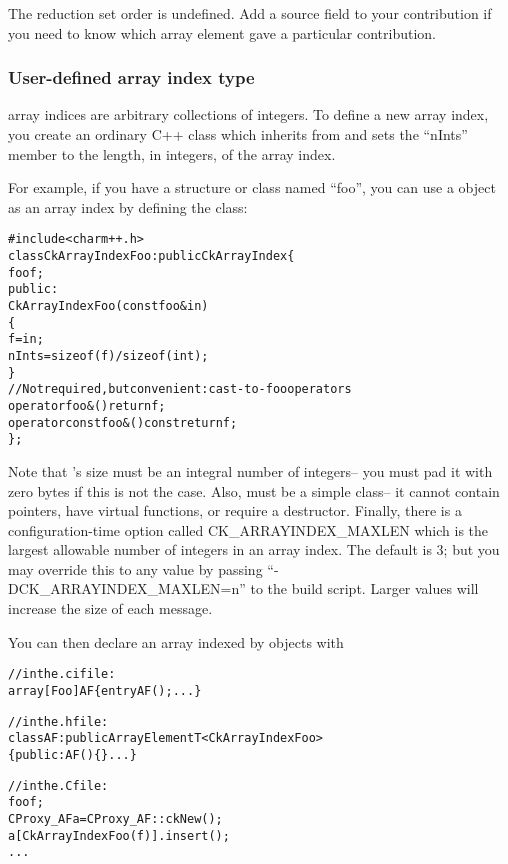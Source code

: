 The reduction set order is undefined.  Add a source field to your contribution
if you need to know which array element gave a particular contribution.



\subsubsection{User-defined array index type}

\charmpp{} array indices are arbitrary collections of integers.
To define a new array index, you create an ordinary C++ class 
which inherits from  and sets the ``nInts'' member
to the length, in integers, of the array index.

For example, if you have a structure or class named ``foo'', you 
can use a  object as an array index by defining the class:

\begin{alltt}
#include <charm++.h>
class CkArrayIndexFoo:public CkArrayIndex \{
    foo f;
public:
    CkArrayIndexFoo(const foo \&in) 
    \{
        f=in;
        nInts=sizeof(f)/sizeof(int);
    \}
    //Not required, but convenient: cast-to-foo operators
    operator foo &() {return f;}
    operator const foo &() const {return f;}
\};
\end{alltt}

Note that 's size must be an integral number of integers--
you must pad it with zero bytes if this is not the case.
Also,  must be a simple class-- it cannot contain 
pointers, have virtual functions, or require a destructor.
Finally, there is a \charmpp configuration-time option called
CK\_ARRAYINDEX\_MAXLEN  
which is the largest allowable number of 
integers in an array index.  The default is 3; but you may 
override this to any value by passing ``-DCK\_ARRAYINDEX\_MAXLEN=n'' 
to the \charmpp build script. Larger values will increase the
size of each message.

You can then declare an array indexed by  objects with

\begin{alltt}
//in the .ci file:
array [Foo] AF \{ entry AF(); ... \}

//in the .h file:
class AF:public ArrayElementT<CkArrayIndexFoo>
\{ public: AF() \{\} ... \}

//in the .C file:
    foo f;
    CProxy_AF a=CProxy_AF::ckNew();
    a[CkArrayIndexFoo(f)].insert();
    ...
\end{alltt}

